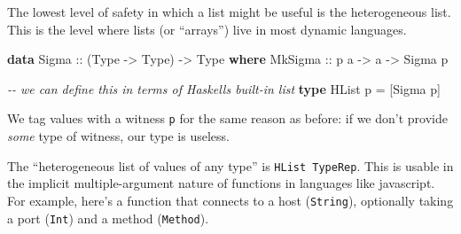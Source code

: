 \documentclass[]{article}
\newenvironment{Shaded}{}{}
\newcommand{\CommentTok}[1]{\textcolor[rgb]{0.38,0.63,0.69}{\textit{#1}}}
\newcommand{\DataTypeTok}[1]{\textcolor[rgb]{0.56,0.13,0.00}{#1}}
\newcommand{\KeywordTok}[1]{\textcolor[rgb]{0.00,0.44,0.13}{\textbf{#1}}}
\newcommand{\NormalTok}[1]{#1}
\newcommand{\OtherTok}[1]{\textcolor[rgb]{0.00,0.44,0.13}{#1}}
\begin{document}
The lowest level of safety in which a list might be useful is the heterogeneous
list. This is the level where lists (or ``arrays'') live in most dynamic
languages.

\begin{Shaded}
\begin{Highlighting}[]
\KeywordTok{data} \DataTypeTok{Sigma}\OtherTok{ ::}\NormalTok{ (}\DataTypeTok{Type} \OtherTok{{-}\textgreater{}} \DataTypeTok{Type}\NormalTok{) }\OtherTok{{-}\textgreater{}} \DataTypeTok{Type} \KeywordTok{where}
    \DataTypeTok{MkSigma}\OtherTok{ ::}\NormalTok{ p a }\OtherTok{{-}\textgreater{}}\NormalTok{ a }\OtherTok{{-}\textgreater{}} \DataTypeTok{Sigma}\NormalTok{ p}

\CommentTok{{-}{-} we can define this in terms of Haskell\textquotesingle{}s built{-}in list}
\KeywordTok{type} \DataTypeTok{HList}\NormalTok{ p }\OtherTok{=}\NormalTok{ [}\DataTypeTok{Sigma}\NormalTok{ p]}
\end{Highlighting}
\end{Shaded}

We tag values with a witness \texttt{p} for the same reason as before: if we
don't provide \emph{some} type of witness, our type is useless.

The ``heterogeneous list of values of any type'' is \texttt{HList\ TypeRep}.
This is usable in the implicit multiple-argument nature of functions in
languages like javascript. For example, here's a function that connects to a
host (\texttt{String}), optionally taking a port (\texttt{Int}) and a method
(\texttt{Method}).
\end{document}
